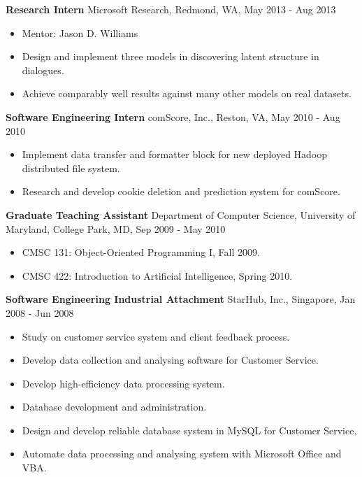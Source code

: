   {\bf Research Intern} \hfill Microsoft Research, Redmond, WA, May 2013 - Aug 2013
  \begin{itemize}
  \item Mentor: Jason D. Williams
  \item Design and implement three models in discovering latent structure in dialogues.
  \item Achieve comparably well results against many other models on real datasets.
  \end{itemize}

  {\bf Software Engineering Intern} \hfill comScore, Inc., Reston, VA, May 2010 - Aug 2010
  \begin{itemize}
  \item Implement data transfer and formatter block for new deployed Hadoop distributed file system.
  \item Research and develop cookie deletion and prediction system for comScore.
  \end{itemize}

  {\bf Graduate Teaching Assistant} \hfill Department of Computer Science, University of Maryland, College Park, MD, Sep 2009 - May 2010
  \begin{itemize}
  \item CMSC 131: Object-Oriented Programming I, Fall 2009.
  \item CMSC 422: Introduction to Artificial Intelligence, Spring 2010.
  \end{itemize}
  
  {\bf Software Engineering Industrial Attachment} \hfill StarHub, Inc., Singapore, Jan 2008 - Jun 2008
  \begin{itemize}
  \item Study on customer service system and client feedback process.
  \item Develop data collection and analysing software for Customer Service.
  \item Develop high-efficiency data processing system.
  \item Database development and administration.
  \item Design and develop reliable database system in MySQL for Customer Service.
  \item Automate data processing and analysing system with Microsoft Office and VBA.
  \end{itemize}
